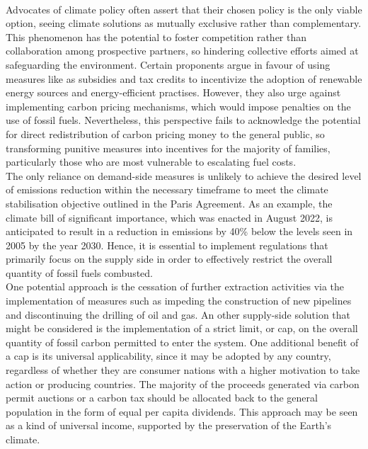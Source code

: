 \documentclass[12pt]{article}
\begin{document}
\\[\baselineskip]
Advocates of climate policy often assert that their chosen policy is the only viable option, seeing climate solutions as mutually exclusive rather than complementary. This phenomenon has the potential to foster competition rather than collaboration among prospective partners, so hindering collective efforts aimed at safeguarding the environment. Certain proponents argue in favour of using measures like as subsidies and tax credits to incentivize the adoption of renewable energy sources and energy-efficient practises. However, they also urge against implementing carbon pricing mechanisms, which would impose penalties on the use of fossil fuels. Nevertheless, this perspective fails to acknowledge the potential for direct redistribution of carbon pricing money to the general public, so transforming punitive measures into incentives for the majority of families, particularly those who are most vulnerable to escalating fuel costs.
\\[\baselineskip]
The only reliance on demand-side measures is unlikely to achieve the desired level of emissions reduction within the necessary timeframe to meet the climate stabilisation objective outlined in the Paris Agreement. As an example, the climate bill of significant importance, which was enacted in August 2022, is anticipated to result in a reduction in emissions by 40\% below the levels seen in 2005 by the year 2030. Hence, it is essential to implement regulations that primarily focus on the supply side in order to effectively restrict the overall quantity of fossil fuels combusted. 
\\[.5\baselineskip]
One potential approach is the cessation of further extraction activities via the implementation of measures such as impeding the construction of new pipelines and discontinuing the drilling of oil and gas. An other supply-side solution that might be considered is the implementation of a strict limit, or cap, on the overall quantity of fossil carbon permitted to enter the system. One additional benefit of a cap is its universal applicability, since it may be adopted by any country, regardless of whether they are consumer nations with a higher motivation to take action or producing countries. The majority of the proceeds generated via carbon permit auctions or a carbon tax should be allocated back to the general population in the form of equal per capita dividends. This approach may be seen as a kind of universal income, supported by the preservation of the Earth's climate.
\\[\baselineskip]
\end{document}
